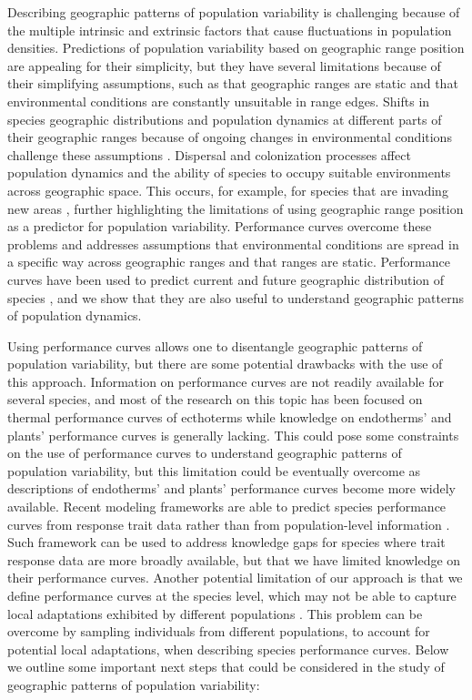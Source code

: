 Describing geographic patterns of population variability is challenging because of the multiple intrinsic and extrinsic factors that cause fluctuations in population densities. Predictions of population variability based on geographic range position are appealing for their simplicity, but they have several limitations because of their simplifying assumptions, such as that geographic ranges are static and that environmental conditions are constantly unsuitable in range edges. Shifts in species geographic distributions and population dynamics at different parts of their geographic ranges because of ongoing changes in environmental conditions challenge these assumptions  \parencite{sheth2018,lewis2023,lawlor2024}. Dispersal and colonization processes affect population dynamics and the ability of species to occupy suitable environments across geographic space. This occurs, for example, for species that are invading new areas \parencite{vaclavik2012}, further highlighting the limitations of using geographic range position as a predictor for population variability. Performance curves overcome these problems and addresses assumptions that environmental conditions are spread in a specific way across geographic ranges and that ranges are static. Performance curves have been used to predict current and future geographic distribution of species \parencite{buckley2008,angilletta2009}, and we show that they are also useful to understand geographic patterns of population dynamics. 

Using performance curves allows one to disentangle geographic patterns of population variability, but there are some potential drawbacks with the use of this approach. Information on performance curves are not readily available for several species, and most of the research on this topic has been focused on thermal performance curves of ecthoterms \parencite{deutsch2008,angilletta2009,vasseur2014, dowd2015,kingsolver2017} while knowledge on endotherms' and plants' performance curves is generally lacking. This could pose some constraints on the use of performance curves to understand geographic patterns of population variability, but this limitation could be eventually overcome as descriptions of endotherms' and plants' performance curves become more widely available. Recent modeling frameworks are able to predict species performance curves from response trait data rather than from population-level information \parencite{simon2024}. Such framework can be used to address knowledge gaps for species where trait response data are more broadly available, but that we have limited knowledge on their performance curves. Another potential limitation of our approach is that we define performance curves at the species level, which may not be able to capture local adaptations exhibited by different populations \parencite{herrando2019,cicchino2023}. This problem can be overcome by sampling individuals from different populations, to account for potential local adaptations, when describing species performance curves. Below we outline some important next steps that could be considered in the study of geographic patterns of population variability: 

